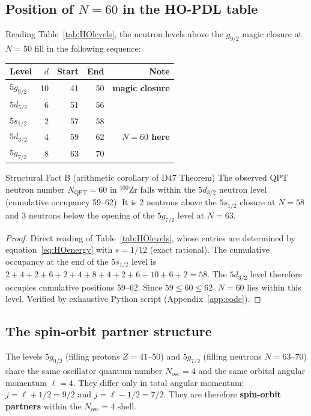 \documentclass[11pt,a4paper]{article}
\theoremstyle{definition}
\theoremstyle{remark}
\newcommand{\MQPT}{N_{\mathrm{QPT}}}
\begin{document}
\subsection{Position of \texorpdfstring{$N=60$}{N=60} in the HO-PDL table}
\label{subsec:N60}

Reading Table~\ref{tab:HOlevels}, the neutron levels above the $g_{9/2}$ magic closure at $N=50$ fill in the following sequence:

\begin{center}
\small
\begin{tabular}{lrrrr}
\toprule
Level & $d$ & Start & End & Note \\
\midrule
$5g_{9/2}$ & 10 & 41 & 50 & \textbf{magic closure} \\
$5d_{5/2}$ &  6 & 51 & 56 & \\
$5s_{1/2}$ &  2 & 57 & 58 & \\
$5d_{3/2}$ &  4 & 59 & 62 & \textbf{$N=60$ here} \\
$5g_{7/2}$ &  8 & 63 & 70 & \\
\bottomrule
\end{tabular}
\end{center}

\begin{pdltheorem}{Structural Fact B (arithmetic corollary of D47 Theorem)}
The observed QPT neutron number $\MQPT = 60$ in $^{100}$Zr falls within the $5d_{3/2}$ neutron level (cumulative occupancy 59--62). It is 2 neutrons above the $5s_{1/2}$ closure at $N=58$ and 3 neutrons below the opening of the $5g_{7/2}$ level at $N=63$.
\end{pdltheorem}

\begin{proof}
Direct reading of Table~\ref{tab:HOlevels}, whose entries are determined by equation~\eqref{eq:HOenergy} with $s = 1/12$ (exact rational). The cumulative occupancy at the end of the $5s_{1/2}$ level is $2+4+2+6+2+4+8+4+2+6+10+6+2 = 58$. The $5d_{3/2}$ level therefore occupies cumulative positions 59--62. Since $59 \leq 60 \leq 62$, $N=60$ lies within this level. Verified by exhaustive Python script (Appendix~\ref{app:code}).
\end{proof}

\subsection{The spin-orbit partner structure}
\label{subsec:SOpartners}

The levels $5g_{9/2}$ (filling protons $Z=41$--50) and $5g_{7/2}$ (filling neutrons $N=63$--70) share the same oscillator quantum number $N_{\mathrm{osc}} = 4$ and the same orbital angular momentum $\ell = 4$. They differ only in total angular momentum: $j = \ell + 1/2 = 9/2$ and $j = \ell - 1/2 = 7/2$. They are therefore \textbf{spin-orbit partners} within the $N_{\mathrm{osc}} = 4$ shell.
\end{document}
